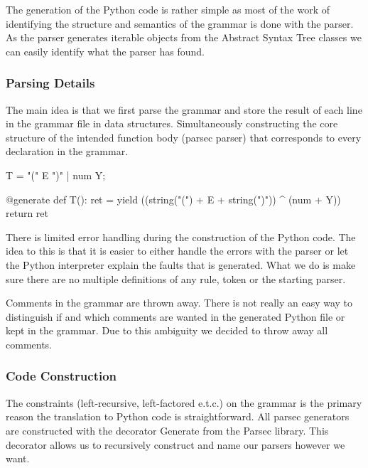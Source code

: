 The generation of the Python code is rather simple as most of the work of identifying the structure and semantics of the grammar is done with the parser. As the parser generates iterable objects from the Abstract Syntax Tree classes we can easily identify what the parser has found.


\subsubsection{Parsing Details}

The main idea is that we first parse the grammar and store the result of each line in the grammar file in data structures. Simultaneously constructing the core structure of the intended function body (parsec parser) that corresponds to every declaration in the grammar.

\renewcommand{\lstlistingname}{Grammar parse}

\begin{python}[caption={Example line from a grammar.}, label=grammar1]
T = "(" E ")" | num Y;
\end{python}

\begin{python}[caption={The constructed Python code that corresponds to \ref{grammar1}.}, label=code1]
@generate
def T():
    ret = yield ((string("(") + E + string(")")) ^ (num + Y))
    return ret
\end{python}




There is limited error handling during the construction of the Python code. The idea to this is that it is easier to either handle the errors with the parser or let the Python interpreter explain the faults that is generated. What we do is make sure there are no multiple definitions of any rule, token or the starting parser.

Comments in the grammar are thrown away. There is not really an easy way to distinguish if and which comments are wanted in the generated Python file or kept in the grammar. Due to this ambiguity we decided to throw away all comments.

\subsubsection{Code Construction}

The constraints (left-recursive, left-factored e.t.c.) on the grammar is the primary reason the translation to Python code is straightforward. All parsec generators are constructed with the decorator Generate from the Parsec library. This decorator allows us to recursively construct and name our parsers however we want.


